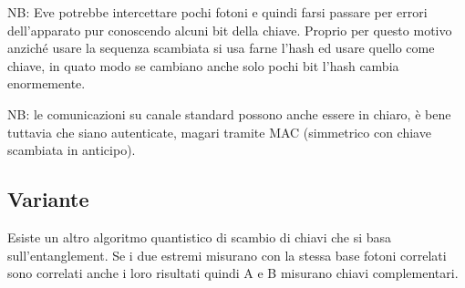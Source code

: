 NB: Eve potrebbe intercettare pochi fotoni e quindi farsi passare per errori dell'apparato pur conoscendo alcuni bit della chiave.
Proprio per questo motivo anziché usare la sequenza scambiata si usa farne l'hash ed usare quello come chiave, in quato modo se cambiano anche solo pochi bit l'hash cambia enormemente.


NB: le comunicazioni su canale standard possono anche essere in chiaro, è bene tuttavia che siano autenticate, magari tramite MAC (simmetrico con chiave scambiata in anticipo).

\subsection{Variante}
Esiste un altro algoritmo quantistico di scambio di chiavi che si basa sull'entanglement.
Se i due estremi misurano con la stessa base fotoni correlati sono correlati anche i loro risultati quindi A e B misurano chiavi complementari.
